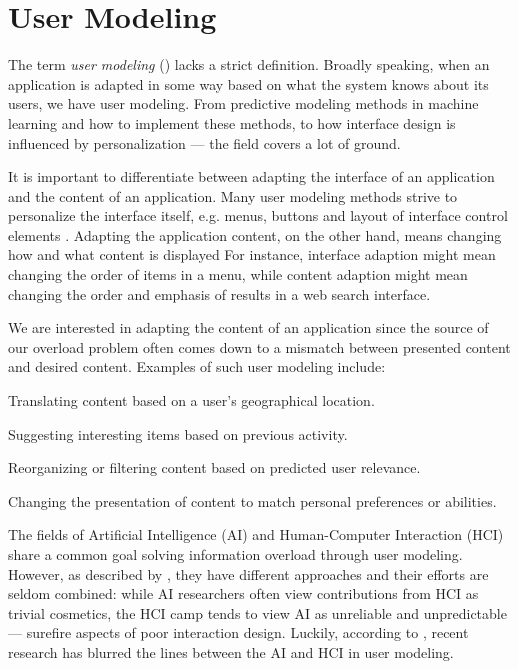 \section{User Modeling}
\label{sec:modeling}

The term \emph{user modeling} () lacks a strict definition. 
Broadly speaking, when an application is adapted in some way based on what the system knows about its users, we have user modeling. 
From predictive modeling methods in machine learning and how to implement these methods, 
to how interface design is influenced by personalization --- the field covers a lot of ground. 

It is important to differentiate between adapting the interface of an application and the content of an application. 
Many user modeling methods strive to personalize the interface itself, e.g. menus, buttons and layout of interface control elements 
\citep{Jameson2009, Fischer2001}. 
Adapting the application content, on the other hand, means changing how and what content is displayed
For instance, interface adaption might mean changing the order of items in a menu, while content 
adaption might mean changing the order and emphasis of results in a web search interface.

We are interested in adapting the content of an application since the source of our overload problem often 
comes down to a mismatch between presented content and desired content. Examples of such user modeling include:

\begin{itemize*}
  \item Translating content based on a user's geographical location.
  \item Suggesting interesting items based on previous activity.
  \item Reorganizing or filtering content based on predicted user relevance.
  \item Changing the presentation of content to match personal preferences or abilities.
\end{itemize*}

The fields of Artificial Intelligence (AI) and Human-Computer Interaction (HCI) share a common goal solving information overload through user modeling. 
However, as described by \cite{Lieberman2009}, they have different approaches and their efforts are seldom combined: 
while AI researchers often view contributions from HCI as trivial cosmetics, the HCI camp
tends to view AI as unreliable and unpredictable --- surefire aspects of poor interaction design.
Luckily, according to \cite{Kobsa2001}, recent research has blurred the lines between the AI and HCI in user modeling.

